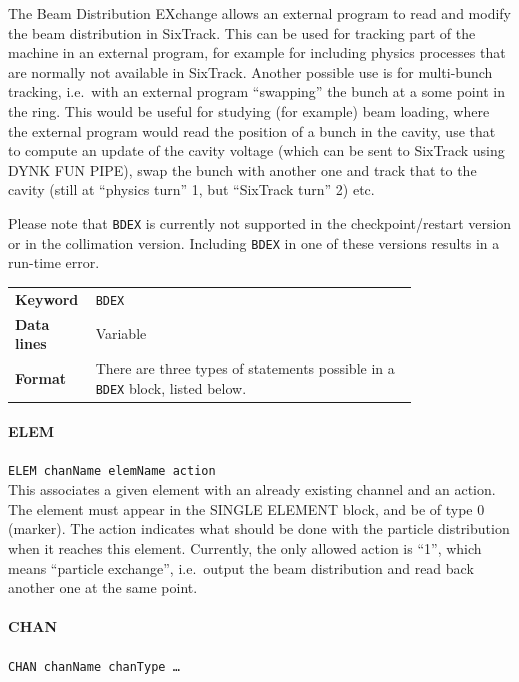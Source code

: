 The Beam Distribution EXchange allows an external program to read and modify the beam distribution in SixTrack.
This can be used for tracking part of the machine in an external program, for example for including physics processes that are normally not available in SixTrack.
Another possible use is for multi-bunch tracking, i.e.\ with an external program ``swapping'' the bunch at a some point in the ring.
This would be useful for studying (for example) beam loading, where the external program would read the position of a bunch in the cavity, use that to compute an update of the cavity voltage (which can be sent to SixTrack using DYNK FUN PIPE), swap the bunch with another one and track that to the cavity (still at ``physics turn'' 1, but ``SixTrack turn'' 2) etc.

Please note that \texttt{BDEX} is currently not supported in the checkpoint/restart version or in the collimation version.
Including \texttt{BDEX} in one of these versions results in a run-time error.

\bigskip
\begin{tabular}{@{}lp{0.8\linewidth}}
    \textbf{Keyword}    & \texttt{BDEX}\index{BDEX} \\
    \textbf{Data lines} & Variable \\
    \textbf{Format}     & There are three types of statements possible in a \texttt{BDEX} block, listed below.
\end{tabular}

\bigskip

\paragraph{ELEM} \texttt{ELEM chanName elemName action}\\

This associates a given element with an already existing channel and an action.
The element must appear in the SINGLE ELEMENT block, and be of type 0 (marker).
The action indicates what should be done with the particle distribution when it reaches this element.
Currently, the only allowed action is ``1'', which means ``particle exchange'', i.e.\ output the beam distribution and read back another one at the same point.

\paragraph{CHAN} \texttt{CHAN chanName chanType \ldots}\\

